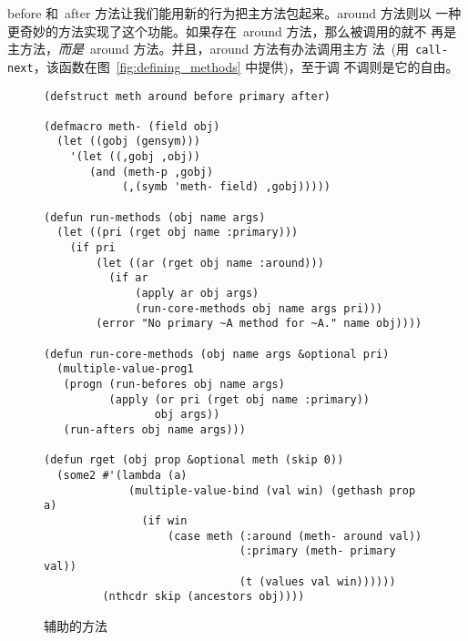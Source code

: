 before 和~after 方法让我们能用新的行为把主方法包起来。around 方法则以
一种更奇妙的方法实现了这个功能。如果存在~around 方法，那么被调用的就不
再是主方法，\emph{而是}~around 方法。并且，around 方法有办法调用主方
法~(用~\verb|call-next|，该函数在图~\ref{fig:defining_methods} 中提供)，至于调
不调则是它的自由。
\begin{figure}
\begin{lstlisting}
(defstruct meth around before primary after)

(defmacro meth- (field obj)
  (let ((gobj (gensym)))
    '(let ((,gobj ,obj))
       (and (meth-p ,gobj)
            (,(symb 'meth- field) ,gobj)))))

(defun run-methods (obj name args)
  (let ((pri (rget obj name :primary)))
    (if pri
        (let ((ar (rget obj name :around)))
          (if ar
              (apply ar obj args)
              (run-core-methods obj name args pri)))
        (error "No primary ~A method for ~A." name obj))))

(defun run-core-methods (obj name args &optional pri)
  (multiple-value-prog1
   (progn (run-befores obj name args)
          (apply (or pri (rget obj name :primary))
                 obj args))
   (run-afters obj name args)))

(defun rget (obj prop &optional meth (skip 0))
  (some2 #'(lambda (a)
             (multiple-value-bind (val win) (gethash prop a)
               (if win
                   (case meth (:around (meth- around val))
                              (:primary (meth- primary val))
                              (t (values val win))))))
         (nthcdr skip (ancestors obj))))
\end{lstlisting}
\caption{\label{fig:auxiliary_methods}辅助的方法}
\end{figure}

